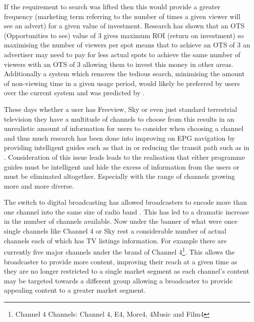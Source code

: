 	If the requirement to search was lifted then this would provide a greater frequency (marketing term referring to the number of times a given viewer will see an advert) for a given value of investment. Research has shown that an OTS (Opportunities to see) value of 3 gives maximum ROI (return on investment) so maximising the number of viewers per spot means that to achieve an OTS of 3 an advertiser may need to pay for less actual spots to achieve the same number of viewers with an OTS of 3 allowing them to invest this money in other areas. Additionally a system which removes the tedious search, minimising the amount of non-viewing time in a given usage period, would likely be preferred by users over the current system and was predicted by \citet{cisco10Reasons}.

	These days whether a user has Freeview, Sky or even just standard terrestrial television they have a multitude of channels to choose from this results in an unrealistic amount of information for users to consider when choosing a channel and thus much research has been done into improving on EPG navigation by providing intelligent guides such as that in \citet{informationOverload} or reducing the transit path such as in \citet{personalisedEPG}. Consideration of this issue leads leads to the realisation that either programme guides must be intelligent and hide the excess of information from the users or must be eliminated altogether. Especially with the range of channels growing more and more diverse.

	The switch to digital broadcasting has allowed broadcasters to encode more than one channel into the same size of radio band \citep{DTVTransmission}. This has led to a dramatic increase in the number of channels available. Now under the banner of what were once single channels like Channel 4 or Sky rest a considerable number of actual channels each of which has TV listings information. For example there are currently five major channels under the brand of Channel 4\footnote{Channel 4 Channels: Channel 4, E4, More4, 4Music and Film4}. This allows the broadcaster to provide more content, improving their reach at a given time as they are no longer restricted to a single market segment as each channel's content may be targeted towards a different group allowing a broadcaster to provide appealing content to a greater market segment.

